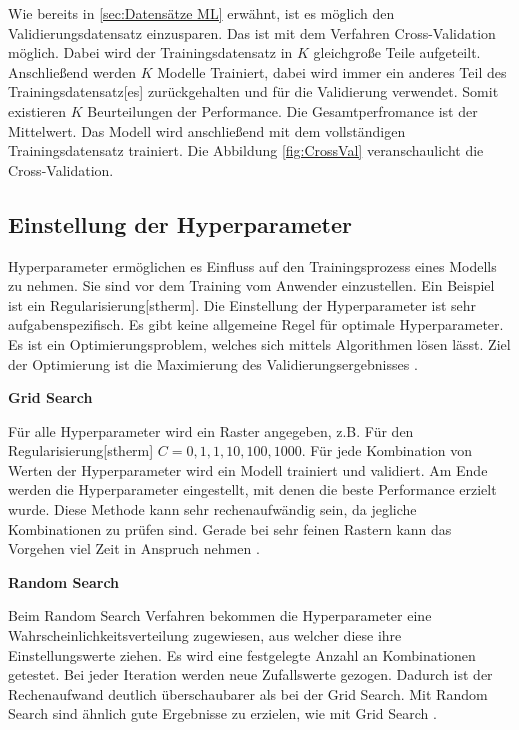 Wie bereits in \ref{sec:Datensätze ML} erwähnt, ist es möglich den Validierungsdatensatz einzusparen. Das ist mit dem Verfahren \gls{Cross-Validation} möglich. Dabei wird der \gls{Trainingsdatensatz} in \(K\) gleichgroße Teile aufgeteilt. Anschließend werden \(K\) Modelle Trainiert, dabei wird immer ein anderes Teil des \gls{Trainingsdatensatz}[es] zurückgehalten und für die Validierung verwendet. Somit existieren \(K\) Beurteilungen der Performance. Die Gesamtperfromance ist der Mittelwert. Das Modell wird anschließend mit dem vollständigen \gls{Trainingsdatensatz} trainiert. Die Abbildung \ref{fig:CrossVal} veranschaulicht die \gls{Cross-Validation}.


\subsection{Einstellung der Hyperparameter} \label{sec:ML HyperPara}
\gls{Hyperparameter} ermöglichen es Einfluss auf den Trainingsprozess eines Modells zu nehmen. Sie sind vor dem Training vom Anwender einzustellen. Ein Beispiel ist ein \gls{Regularisierung}[stherm]. Die Einstellung der \gls{Hyperparameter} ist sehr aufgabenspezifisch. Es gibt keine allgemeine Regel für optimale \gls{Hyperparameter}. Es ist ein Optimierungsproblem, welches sich mittels Algorithmen lösen lässt. Ziel der Optimierung ist die Maximierung des Validierungsergebnisses \cite{Zheng.2015}.\dubpar


\textbf{Grid Search}\par

Für alle \gls{Hyperparameter} wird ein Raster angegeben, z.B. Für den \gls{Regularisierung}[stherm] \(C = {0,1,1,10,100,1000}\). Für jede Kombination von Werten der \gls{Hyperparameter} wird ein Modell trainiert und validiert. Am Ende werden die \gls{Hyperparameter} eingestellt, mit denen die beste Performance erzielt wurde. Diese Methode kann sehr rechenaufwändig sein, da jegliche Kombinationen zu prüfen sind. Gerade bei sehr feinen Rastern kann das Vorgehen viel Zeit in Anspruch nehmen \cite{Zheng.2015}.\dubpar

\textbf{Random Search}\par

Beim Random Search Verfahren bekommen die \gls{Hyperparameter} eine Wahrscheinlichkeitsverteilung zugewiesen, aus welcher diese ihre Einstellungswerte ziehen. Es wird eine festgelegte Anzahl an Kombinationen getestet. Bei jeder Iteration werden neue Zufallswerte gezogen. Dadurch ist der Rechenaufwand deutlich überschaubarer als bei der Grid Search. Mit Random Search sind ähnlich gute Ergebnisse zu erzielen, wie mit Grid Search \cite{Zheng.2015, Burkov.2019}.


